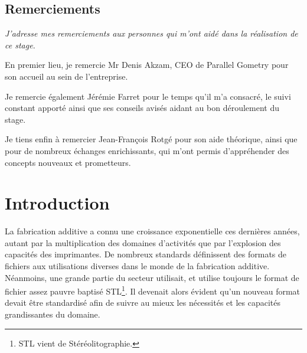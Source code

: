 \documentclass{tnreport}
\begin{document}
  
\maketitle
{}


\cleardoublepage

\makesecondtitle

\section*{Remerciements}

{\em
J'adresse mes remerciements aux personnes qui m'ont aidé dans la réalisation de ce stage.

En premier lieu, je remercie Mr Denis Akzam, CEO de Parallel Gometry pour son accueil au sein de l'entreprise.

Je remercie également Jérémie Farret pour le temps qu'il m'a consacré, le suivi constant apporté ainsi que ses conseils avisés aidant au bon déroulement du stage.

Je tiens enfin à remercier Jean-François Rotgé pour son aide théorique, ainsi que pour de nombreux échanges enrichissants, qui m'ont permis d'appréhender des concepts nouveaux et prometteurs. 
}

\hspace{4cm}

\cleardoublepage

\renewcommand{\baselinestretch}{0.5}\normalsize
\tableofcontents
\renewcommand{\baselinestretch}{1.0}\normalsize
\cleardoublepage

\setcounter{page}{1}

\chapter{Introduction}
La fabrication additive a connu une croissance exponentielle ces dernières années, autant par la multiplication des domaines d'activités que par l'explosion des capacités des imprimantes. De nombreux standards définissent des formats de fichiers aux utilisations diverses dans le monde de la fabrication additive. Néanmoins, une grande partie du secteur utilisait, et utilise toujours le format de fichier assez pauvre baptisé STL\footnote{STL vient de Stéréolitographie.}. Il devenait alors évident qu'un nouveau format devait être standardisé afin de suivre au mieux les nécessités et les capacités grandissantes du domaine. 
\end{document}
